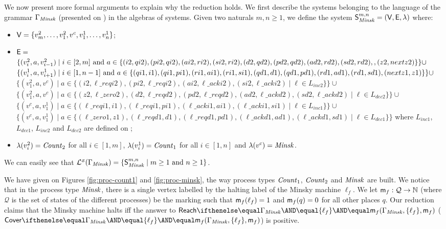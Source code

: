 We now present more formal arguments to explain why the reduction holds.
We first describe the systems belonging to the language of the  grammar $\Gamma_{\mathit{Minsk}}$
(presented on ) in the algebras of systems.
Given two naturals $m,n \geq 1$, we define the system
$\mathsf{S}^{m,n}_{\mathit{\mathit{Minsk}}}=(\mathsf{V},\mathsf{E},\lambda)$ where:
\begin{itemize}
    \item $\mathsf{V}=\{v^2_m,\ldots,v^2_1,v^c,v^1_1,\ldots,v^1_n\}$;
    \item $\mathsf{E}=$\\$\{(v^2_i,a,v^2_{i-1}) \mid i \in [2,m] \mbox{ and } a \in \{(i2,qi2),(pi2,qi2),(ai2,ri2),(si2,ri2),\linebreak[0](d2,qd2),\linebreak[0](pd2,qd2),(ad2,rd2),(sd2,rd2),,(z2,nextz2)\}\} \cup $\\
    $\{(v^1_i,a,v^1_{i+1}) \mid i \in [1,n-1] \mbox{ and } a \in \{(qi1,i1),(qi1,pi1),(ri1,ai1),(ri1,si1),\linebreak[0](qd1,d1),\linebreak[0](qd1,pd1),(rd1,ad1),(rd1,sd1),(nextz1,z1)\}\} \cup$\\
    $\{(v^2_1,a,v^c) \mid a \in \{(i2,\ell\_reqi2), (pi2,\ell\_reqi2), (ai2,\ell\_acki2),(si2,\ell\_acki2)\mid \ell \in L_{inc2} \}\} \cup$\\
    $\{(v^2_1,a,v^c) \mid a \in \{(z2,\ell\_zero2),(d2,\ell\_reqd2),(pd2,\ell\_reqd2),(ad2,\ell\_ackd2),(sd2,\ell\_ackd2)\mid \ell \in L_{dec2} \}\} \cup$
    $\{(v^c,a,v^1_1) \mid a \in \{(\ell\_reqi1,i1), (\ell\_reqi1,pi1), (\ell\_acki1,ai1),(\ell\_acki1,si1)\mid \ell \in L_{inc1} \}\} \cup$\\
    $\{(v^c,a,v^1_1) \mid a \in \{(\ell\_zero1,z1),(\ell\_reqd1,d1),(\ell\_reqd1,pd1),(\ell\_ackd1,ad1),(\ell\_ackd1,sd1)\mid \ell \in L_{dec1} \}\}$ where $L_{inc1}$, $L_{dec1}$, $L_{inc2}$ and $L_{dec2}$ are defined on ;
    \item $\lambda(v^2_i)=\mathit{Count}_2$ for all $i \in [1,m]$, $\lambda(v^1_i)=\mathit{Count}_1$ for all $i \in [1,n]$ and $\lambda(v^c)=\mathit{Minsk}$.

\end{itemize}

We can easily see that
$\mathcal{L}_{}^{\scriptscriptstyle{\mathcal{S}}}({\Gamma_{\mathit{Minsk}}})={\{ {\mathsf{S}^{m,n}_{\mathit{Minsk}} \mid m \geq 1 \mbox{ and } n \geq 1} \}}$.

We have given on Figures \ref{fig:proc-count1} and \ref{fig:proc-minsk},
the way process types $\mathit{Count}_1$, $\mathit{Count}_2$ and $\mathit{Minsk}$ are built.
We notice that in the process type $\mathit{Minsk}$,
there is a single vertex labelled by the halting label of the Minsky machine $\ell_f$. We let  $\mathsf{m}_f:\mathcal{Q}
  \rightarrow\mathbb{N}$ (where $\mathcal{Q}$ is the set of states of the different processes) be the marking such that
$\mathsf{m}_f(\ell_f)=1$ and $\mathsf{m}_f(q)=0$ for all other places $q$.
Our reduction claims that the Minsky machine halts iff the answer to
$\paramreach{\grammar_{\Minsk}}{\{\ell_f\}}{\amark_f}$
(\resp $\paramcover{\grammar_{\Minsk}}{\{\ell_f\}}{\amark_f}$) is positive.

